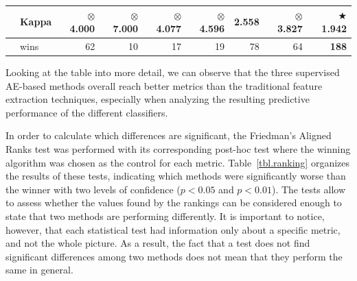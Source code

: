 \documentclass[
	fontsize=11pt, %
	twoside=false, %
	open=any, %
	secnumdepth=1, %
]{kaobook}
\newcommand{\change}[1]{{\color{blue}#1}}
\renewcommand{\change}[1]{#1}
\begin{document}
\begin{table}[ht]
{{\begin{tabular}{llrrrrrrr}
                                             & Kappa                       & \(\otimes\) 4.000          & \(\otimes\) 7.000  & \(\otimes\) 4.077  & \(\otimes\) 4.596 & 2.558                                   & \(\otimes\) 3.827  & \(\bigstar\) {\bfseries1.942} \tabularnewline
      \midrule
                                             & wins                        & 62                         & 10                 & 17                 & 19                & 78                                      & 64                 & {\bfseries 188} \tabularnewline              %
      \bottomrule %
    \end{tabular}}}
\end{table}

Looking at the table into more detail, we can observe that the three supervised AE-based methods overall reach better metrics than the traditional feature extraction techniques, especially when analyzing the resulting predictive performance of the different classifiers.

In order to calculate which differences are significant, the Friedman's Aligned Ranks test %
was performed with its corresponding post-hoc test where the winning algorithm was chosen as the control for each metric. \change{Table~\ref{tbl.ranking}} organizes the results of these tests, indicating which methods  were significantly worse than the winner with two levels of confidence ($p<0.05$ and $p<0.01$). The tests allow to assess whether the values found by the rankings can be considered enough to state that two methods are performing differently. It is important to notice, however, that each statistical test had information only about a specific metric, and not the whole picture. As a result, the fact that a test does not find significant differences among two methods does not mean that they perform the same in general.
\end{document}
